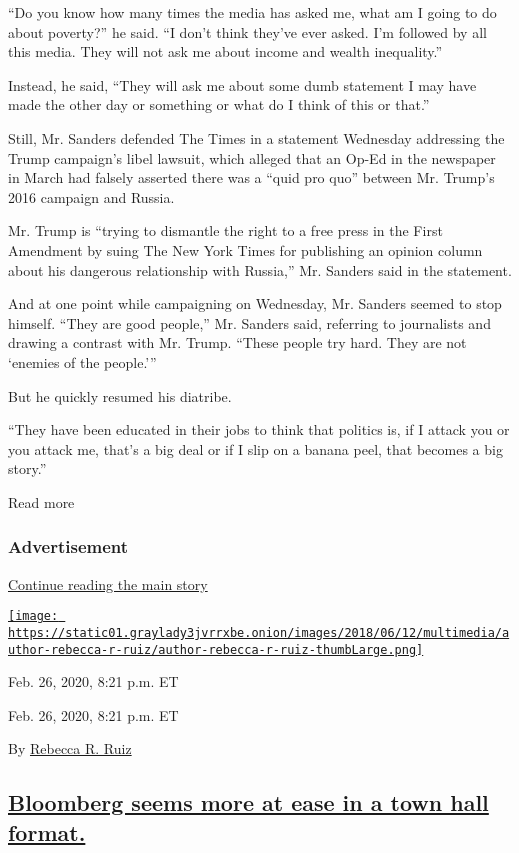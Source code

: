 ``Do you know how many times the media has asked me, what am I going to
do about poverty?'' he said. ``I don't think they've ever asked. I'm
followed by all this media. They will not ask me about income and wealth
inequality.''

Instead, he said, ``They will ask me about some dumb statement I may
have made the other day or something or what do I think of this or
that.''

Still, Mr. Sanders defended The Times in a statement Wednesday
addressing the Trump campaign's libel lawsuit, which alleged that an
Op-Ed in the newspaper in March had falsely asserted there was a ``quid
pro quo'' between Mr. Trump's 2016 campaign and Russia.

Mr. Trump is ``trying to dismantle the right to a free press in the
First Amendment by suing The New York Times for publishing an opinion
column about his dangerous relationship with Russia,'' Mr. Sanders said
in the statement.

And at one point while campaigning on Wednesday, Mr. Sanders seemed to
stop himself. ``They are good people,'' Mr. Sanders said, referring to
journalists and drawing a contrast with Mr. Trump. ``These people try
hard. They are not `enemies of the people.'''

But he quickly resumed his diatribe.

``They have been educated in their jobs to think that politics is, if I
attack you or you attack me, that's a big deal or if I slip on a banana
peel, that becomes a big story.''

Read more

\hypertarget{advertisement-1}{%
\subsubsection{Advertisement}\label{advertisement-1}}

\protect\hyperlink{after-dfp-ad-mid2}{Continue reading the main story}

\href{https://www.nytimes3xbfgragh.onion/by/rebecca-r-ruiz}{\texttt{[image: https://static01.graylady3jvrrxbe.onion/images/2018/06/12/multimedia/author-rebecca-r-ruiz/author-rebecca-r-ruiz-thumbLarge.png]}}

Feb. 26, 2020, 8:21 p.m. ET

Feb. 26, 2020, 8:21 p.m. ET

By \href{https://www.nytimes3xbfgragh.onion/by/rebecca-r-ruiz}{Rebecca
R. Ruiz}

\hypertarget{bloomberg-seems-more-at-ease-in-a-town-hall-format}{%
\subsection{\texorpdfstring{\protect\hyperlink{michael-bloomberg-cnn-town-hall}{Bloomberg
seems more at ease in a town hall
format.}}{Bloomberg seems more at ease in a town hall format.}}\label{bloomberg-seems-more-at-ease-in-a-town-hall-format}}


